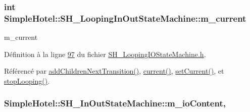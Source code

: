 \hypertarget{classSimpleHotel_1_1SH__LoopingInOutStateMachine_a700a3c54ef593c94815a0418d83dd381}{
\subsubsection[{m\-\_\-current}]{\setlength{\rightskip}{0pt plus 5cm}int Simple\-Hotel\-::\-S\-H\-\_\-\-Looping\-In\-Out\-State\-Machine\-::m\-\_\-current\hspace{0.3cm}{\ttfamily [private]}}}\label{classSimpleHotel_1_1SH__LoopingInOutStateMachine_a700a3c54ef593c94815a0418d83dd381}


m\-\_\-current 



Définition à la ligne \hyperlink{SH__LoopingIOStateMachine_8h_source_l00097}{97} du fichier \hyperlink{SH__LoopingIOStateMachine_8h_source}{S\-H\-\_\-\-Looping\-I\-O\-State\-Machine.\-h}.



Référencé par \hyperlink{classSimpleHotel_1_1SH__LoopingInOutStateMachine_a2ac2ff43d97fd1b12e1b30d6818f33e4}{add\-Children\-Next\-Transition()}, \hyperlink{classSimpleHotel_1_1SH__LoopingInOutStateMachine_a8fea676c16c02ceb82cbb8a93088634e}{current()}, \hyperlink{classSimpleHotel_1_1SH__LoopingInOutStateMachine_a353f7fbee54dd8e544b32c81db0658a2}{set\-Current()}, et \hyperlink{classSimpleHotel_1_1SH__LoopingInOutStateMachine_a64951d436e3f998c7136415019021ec8}{stop\-Looping()}.

\hypertarget{classSimpleHotel_1_1SH__InOutStateMachine_a4b0a3a48b0da31fddb724a357ad9b52c}{
\subsubsection[{m\-\_\-io\-Content}]{\setlength{\rightskip}{0pt plus 5cm}Simple\-Hotel\-::\-S\-H\-\_\-\-In\-Out\-State\-Machine\-::m\-\_\-io\-Content\hspace{0.3cm}{\ttfamily [protected]}, {\ttfamily [inherited]}}}\label{classSimpleHotel_1_1SH__InOutStateMachine_a4b0a3a48b0da31fddb724a357ad9b52c}


